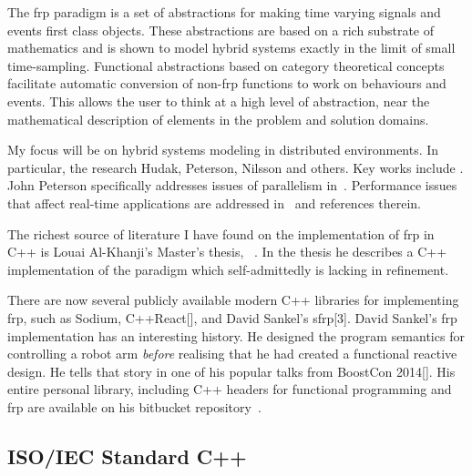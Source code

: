 The \ac{frp} paradigm is a set of abstractions for making time varying signals
and events first class objects. These abstractions are based on a rich substrate
of mathematics and is shown to model hybrid systems exactly in the limit of
small time-sampling. Functional abstractions based on category theoretical
concepts facilitate automatic conversion of non-\ac{frp} functions to work on
behaviours and events. This allows the user to think at a high level of
abstraction, near the mathematical description of elements in the problem and
solution domains.

My focus will be on hybrid systems modeling in distributed environments. In
particular, the research Hudak, Peterson, Nilsson and others. Key works include
\cite{Hudak2003,Nilsson2003,Courtney2003b}. John Peterson specifically addresses
issues of parallelism in~\cite{Peterson2000}. Performance issues that affect
real-time applications are addressed in~\cite{Hudak2003} and references therein.

The richest source of literature I have found on the implementation of \ac{frp}
in C++ is Louai Al-Khanji's Master's thesis,
~\cite{Al-Khanji2015}. In the thesis he describes a C++
implementation of the paradigm which self-admittedly is lacking in refinement.

There are now several publicly available modern C++ libraries for implementing
\ac{frp}, such as Sodium,
C++React[\onelineskip], and
David Sankel's sfrp[3\onelineskip]. David
Sankel's \ac{frp} implementation has an interesting history. He designed the
program semantics for controlling a robot arm \emph{before} realising that he
had created a functional reactive design. He tells that story in one of his
popular talks from BoostCon
2014[\onelineskip]. His entire
personal library, including C++ headers for functional programming and \ac{frp}
are available on his bitbucket repository~\cite{sbase}.


\subsection{ISO/IEC Standard C++}



